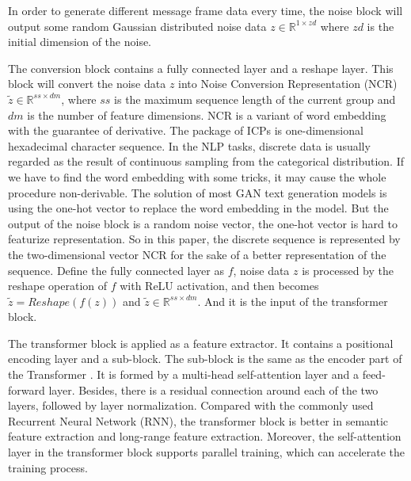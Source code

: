 In order to generate different message frame data every time, the noise block will output some random Gaussian distributed noise data $z \in \mathbb{R}^{1 \times zd}$ where $zd$ is the initial dimension of the noise. 

The conversion block contains a fully connected layer and a reshape layer. This block will convert the noise data $z$ into Noise Conversion Representation (NCR) $\tilde{z} \in \mathbb{R}^{ss \times dm}$, where $ss$ is the maximum sequence length of the current group and $dm$ is the number of feature dimensions. NCR is a variant of word embedding with the guarantee of derivative. The package of ICPs is one-dimensional hexadecimal character sequence. 
In the NLP tasks, discrete data is usually regarded as the result of continuous sampling from the categorical distribution. If we have to find the word embedding with some tricks, it may cause the whole procedure non-derivable.%
The solution of most GAN text generation models is using the one-hot vector to replace the word embedding in the model. But the output of the noise block is a random noise vector, the one-hot vector is hard to featurize representation. %
So in this paper, the discrete sequence is represented by the two-dimensional vector NCR for the sake of a better representation of the sequence. Define the fully connected layer as $f$, noise data $z$ is processed by the reshape operation of $f$ with ReLU activation, and then becomes $\tilde{z} = Reshape(f(z))$ and $ \tilde{z} \in \mathbb{R}^{ss \times {dm}}$. And it is the input of the transformer block.  %

The transformer block is applied as a feature extractor. It contains a positional encoding layer and a sub-block. The sub-block is the same as the encoder part of the Transformer \cite{vaswani2017attention}. It is formed by a multi-head self-attention layer and a feed-forward layer. Besides, there is a residual connection around each of the two layers, followed by layer normalization. Compared with the commonly used Recurrent Neural Network (RNN), the transformer block is better in semantic feature extraction and long-range feature extraction. Moreover, the self-attention layer in the transformer block supports parallel training, which can accelerate the training process. %

